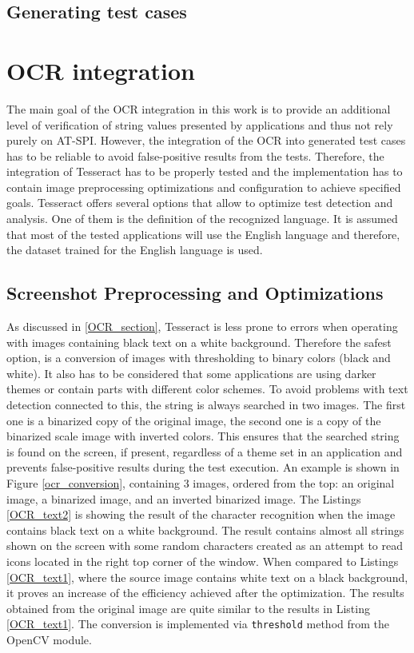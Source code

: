 \subsection{Generating test cases}



\section{OCR integration}
The main goal of the OCR integration in this work is to provide an additional level of verification of string values presented by applications and thus not rely purely on AT-SPI. However, the integration of the OCR into generated test cases has to be reliable to avoid false-positive results from the tests. Therefore, the integration of Tesseract has to be properly tested and the implementation has to contain image preprocessing optimizations and configuration to achieve specified goals.
Tesseract offers several options that allow to optimize test detection and analysis. One of them is  the definition of the recognized language. It is assumed that most of the tested applications will use the English language and therefore, the dataset trained for the English language is used.

\subsection{Screenshot Preprocessing and Optimizations}
As discussed in \ref{OCR_section}, Tesseract is less prone to errors when operating with images containing black text on a white background. Therefore the safest option, is a conversion of images with thresholding to binary colors (black and white). It also has to be considered that some applications are using darker themes or contain parts with different color schemes. To avoid problems with text detection connected to this, the string is always searched in two images. The first one is a binarized copy of the original image, the second one is a copy of the binarized scale image with inverted colors. This ensures that the searched string is found on the screen, if present, regardless of a theme set in an application and prevents false-positive results during the test execution. An example is shown in Figure \ref{ocr_conversion}, containing 3 images, ordered from the top: an original image, a binarized image, and an inverted binarized image. The Listings \ref{OCR_text2} is showing the result of the character recognition when the image contains black text on a white background. The result contains almost all strings shown on the screen with some random characters created as an attempt to read icons located in the right top corner of the window. When compared to Listings \ref{OCR_text1}, where the source image contains white text on a black background, it proves an increase of the efficiency achieved after the optimization. The results obtained from the original image are quite similar to the results in Listing \ref{OCR_text1}. The conversion is implemented via \texttt{threshold} method from the OpenCV module.

